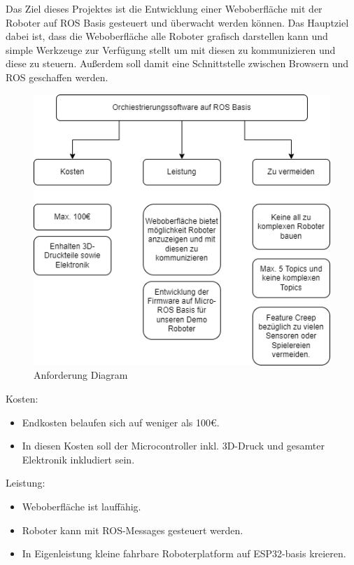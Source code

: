 \begin{flushleft}
    Das Ziel dieses Projektes ist die Entwicklung einer Weboberfläche mit der Roboter auf ROS Basis gesteuert und überwacht werden können.
    Das Hauptziel dabei ist, dass die Weboberfläche alle Roboter grafisch darstellen kann und simple Werkzeuge zur Verfügung stellt um mit diesen zu kommunizieren
    und diese zu steuern.
    Außerdem soll damit eine Schnittstelle zwischen Browsern und ROS geschaffen werden.
    

    \begin{figure}[h!]
        \centering
        \includegraphics[width=1\textwidth]{imgs/Zielsetzung.png}
        \caption{Anforderung Diagram}
        \label{fig:dia_anforderung}%
    \end{figure}

    Kosten:
    \begin{itemize}
    \item Endkosten belaufen sich auf weniger als 100€.
    \item In diesen Kosten soll der Microcontroller inkl. 3D-Druck und gesamter Elektronik inkludiert sein.
    \end{itemize}

    Leistung:
    \begin{itemize}
    \item Weboberfläche ist lauffähig.
    \item Roboter kann mit ROS-Messages gesteuert werden.
    \item In Eigenleistung kleine fahrbare Roboterplatform auf ESP32-basis kreieren.
    \end{itemize}
        

\end{flushleft}

